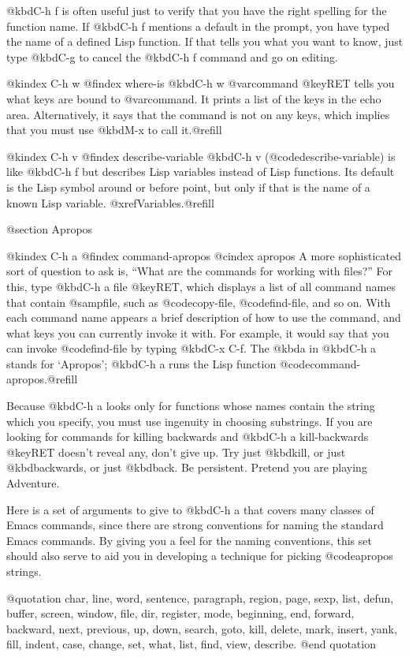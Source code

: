 {{{{{  @kbd{C-h f} is often useful just to verify that you have the right
spelling for the function name.  If @kbd{C-h f} mentions a default in the
prompt, you have typed the name of a defined Lisp function.  If that tells
you what you want to know, just type @kbd{C-g} to cancel the @kbd{C-h f}
command and go on editing.

@kindex C-h w
@findex where-is
  @kbd{C-h w @var{command} @key{RET}} tells you what keys are bound to
@var{command}.  It prints a list of the keys in the echo area.
Alternatively, it says that the command is not on any keys, which implies
that you must use @kbd{M-x} to call it.@refill

@kindex C-h v
@findex describe-variable
  @kbd{C-h v} (@code{describe-variable}) is like @kbd{C-h f} but describes
Lisp variables instead of Lisp functions.  Its default is the Lisp symbol
around or before point, but only if that is the name of a known Lisp
variable.  @xref{Variables}.@refill

@section Apropos

@kindex C-h a
@findex command-apropos
@cindex apropos
  A more sophisticated sort of question to ask is, ``What are the commands
for working with files?''  For this, type @kbd{C-h a file @key{RET}}, which
displays a list of all command names that contain @samp{file}, such as
@code{copy-file}, @code{find-file}, and so on.  With each command name
appears a brief description of how to use the command, and what keys you
can currently invoke it with.  For example, it would say that you can
invoke @code{find-file} by typing @kbd{C-x C-f}.  The @kbd{a} in @kbd{C-h
a} stands for `Apropos'; @kbd{C-h a} runs the Lisp function
@code{command-apropos}.@refill

  Because @kbd{C-h a} looks only for functions whose names contain the
string which you specify, you must use ingenuity in choosing substrings.
If you are looking for commands for killing backwards and @kbd{C-h a
kill-backwards @key{RET}} doesn't reveal any, don't give up.  Try just
@kbd{kill}, or just @kbd{backwards}, or just @kbd{back}.  Be persistent.
Pretend you are playing Adventure.

  Here is a set of arguments to give to @kbd{C-h a} that covers many
classes of Emacs commands, since there are strong conventions for naming
the standard Emacs commands.  By giving you a feel for the naming
conventions, this set should also serve to aid you in developing a
technique for picking @code{apropos} strings.

@quotation
char, line, word, sentence, paragraph, region, page, sexp, list, defun,
buffer, screen, window, file, dir, register, mode,
beginning, end, forward, backward, next, previous, up, down, search, goto,
kill, delete, mark, insert, yank, fill, indent, case,
change, set, what, list, find, view, describe.
@end quotation

}}}}}
